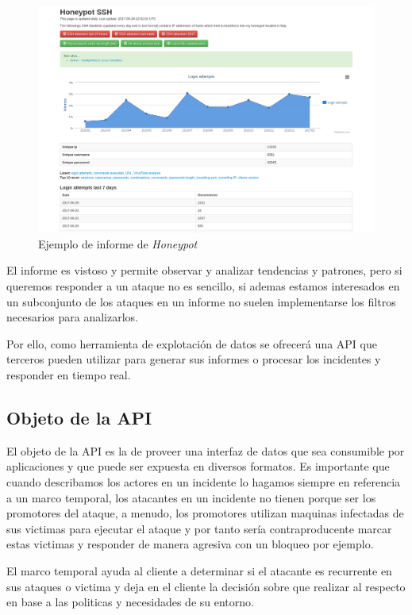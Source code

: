 \begin{figure}[h]
    \centering
      \includegraphics[scale=0.3]{images/honeypot_informe}
    \caption{Ejemplo de informe de \emph{Honeypot}}
    \label{fig:informe-honeypot}
  \end{figure}

El informe es vistoso y permite observar y analizar tendencias y patrones, pero si queremos responder a un ataque no es sencillo, si ademas estamos interesados en un subconjunto de los ataques
en un informe no suelen implementarse los filtros necesarios para analizarlos.

Por ello, como herramienta de explotación de datos se ofrecerá una API que terceros pueden utilizar para generar sus informes o procesar los incidentes y responder
en tiempo real.

\subsection{Objeto de la API}

El objeto de la API es la de proveer una interfaz de datos que sea consumible por aplicaciones y que puede ser expuesta en diversos formatos.
Es importante que cuando describamos los actores en un incidente lo hagamos siempre en referencia a un marco temporal, los atacantes
en un incidente no tienen porque ser los promotores del ataque, a menudo, los promotores utilizan maquinas infectadas de sus victimas para ejecutar el ataque
y por tanto sería contraproducente marcar estas victimas y responder de manera agresiva con un bloqueo por ejemplo.

El marco temporal ayuda al cliente a determinar si el atacante es recurrente en sus ataques o victima y deja en el cliente la decisión sobre que realizar al respecto en base a 
las politicas y necesidades de su entorno.

